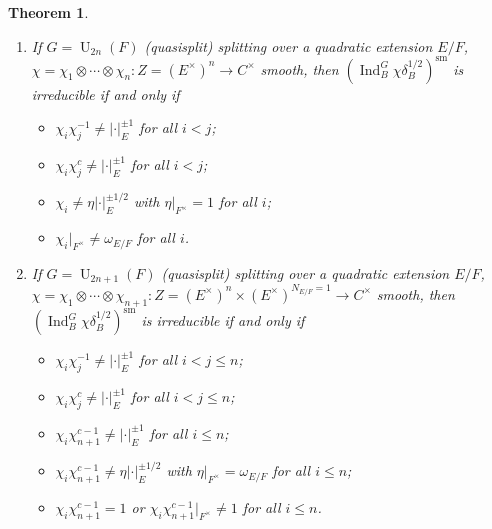\documentclass[a4paper]{amsart}
\numberwithin{equation}{section}
\newtheorem{thm}{Theorem}[section]
\theoremstyle{remark}
\theoremstyle{definition}
\DeclareMathOperator{\Ind}{Ind}
\DeclareMathOperator{\U}{U}
\newcommand{\sm}{\mathrm{sm}}
\begin{document}
\begin{thm}
\begin{enumerate}
    \begin{itemize}
    \item $\chi_i \chi_j^{\pm 1} \ne \lvert \cdot\rvert_F^{\pm 1}$ for all $i < j < n$;
    \item $(\chi_i \circ N_{E/F}) \chi_n^{c-1} \ne \lvert\cdot\rvert_E^{\pm 1}$ for all $i < n$ if $\chi_n^2 = 1$;
    \item the set $\{\chi_i : \text{$i < n$ and $\chi_i^2 = 1$}\}$ has at most one element if $\chi_n^2 \ne 1$; \\
      ($\chi_i^2 \ne 1$ or $(\chi_i \circ N_{E/F})\chi_n^{c-1} = 1$) for all $i < n$ if $\chi_n^2 = 1$. 
    \end{itemize}
  \item If $G = \U_{2n}(F)$ (quasisplit) splitting over a quadratic extension $E/F$, $\chi = \chi_{1}\otimes\cdots\otimes\chi_{n}\colon Z = (E^\times)^n \to C^{\times}$ smooth, then
    $(\Ind_{B}^{G}\chi\delta_B^{1/2})^{\sm}$ is irreducible if and only if
    \begin{itemize}
    \item $\chi_i \chi_j^{-1} \ne \lvert \cdot\rvert_E^{\pm 1}$ for all $i < j$;
    \item $\chi_i \chi_j^{c} \ne \lvert \cdot\rvert_E^{\pm 1}$ for all $i < j$;
    \item $\chi_i \ne \eta \lvert \cdot\rvert_E^{\pm 1/2}$ with $\eta|_{F^\times} = 1$ for all $i$;
    \item $\chi_i|_{F^\times} \ne \omega_{E/F}$ for all $i$.     \end{itemize}
  \item If $G = \U_{2n+1}(F)$ (quasisplit) splitting over a quadratic extension $E/F$, $\chi = \chi_{1}\otimes\cdots\otimes\chi_{n+1}\colon Z = (E^\times)^n \times (E^\times)^{N_{E/F}=1}\to C^{\times}$ smooth, then
    $(\Ind_{B}^{G}\chi\delta_B^{1/2})^{\sm}$ is irreducible if and only if
    \begin{itemize}
    \item $\chi_i \chi_j^{-1} \ne \lvert \cdot\rvert_E^{\pm 1}$ for all $i < j \le n$;
    \item $\chi_i \chi_j^{c} \ne \lvert \cdot\rvert_E^{\pm 1}$ for all $i < j \le n$;
    \item $\chi_i \chi_{n+1}^{c-1} \ne \lvert \cdot\rvert_E^{\pm 1}$ for all $i \le n$;
    \item $\chi_i \chi_{n+1}^{c-1} \ne \eta \lvert \cdot\rvert_E^{\pm 1/2}$ with $\eta|_{F^\times} = \omega_{E/F}$ for all $i \le n$;
    \item $\chi_i \chi_{n+1}^{c-1} = 1$ or $\chi_i \chi_{n+1}^{c-1}|_{F^\times} \ne 1$ for all $i \le n$.
    \end{itemize}
  \end{enumerate}
\end{thm}
\end{document}
